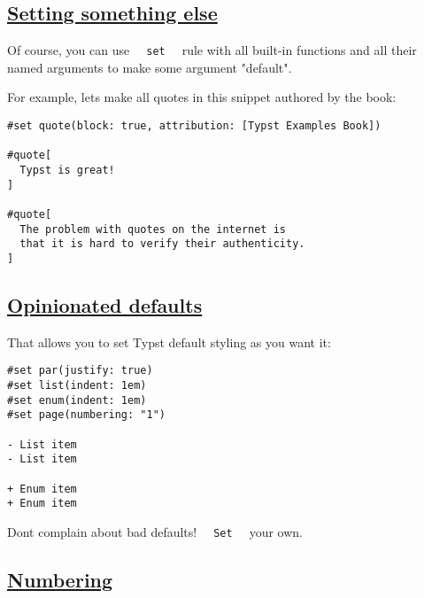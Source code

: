 \pandocbounded{}

\subsection{\texorpdfstring{\hyperref[setting-something-else]{Setting
something else}}{Setting something else}}\label{setting-something-else}

Of course, you can use \texttt{\ }{\texttt{\ set\ }}\texttt{\ } rule
with all built-in functions and all their named arguments to make some
argument "default".

For example, let\textquotesingle s make all quotes in this snippet
authored by the book:

\begin{verbatim}
#set quote(block: true, attribution: [Typst Examples Book])

#quote[
  Typst is great!
]

#quote[
  The problem with quotes on the internet is
  that it is hard to verify their authenticity.
]
\end{verbatim}

\pandocbounded{}

\subsection{\texorpdfstring{\hyperref[opinionated-defaults]{Opinionated
defaults}}{Opinionated defaults}}\label{opinionated-defaults}

That allows you to set Typst default styling as you want it:

\begin{verbatim}
#set par(justify: true)
#set list(indent: 1em)
#set enum(indent: 1em)
#set page(numbering: "1")

- List item
- List item

+ Enum item
+ Enum item
\end{verbatim}

\pandocbounded{}

Don\textquotesingle t complain about bad defaults!
\texttt{\ }{\texttt{\ Set\ }}\texttt{\ } your own.

\subsection{\texorpdfstring{\hyperref[numbering]{Numbering}}{Numbering}}\label{numbering}

